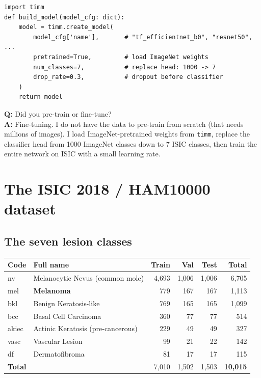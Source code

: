 \documentclass[11pt,a4paper]{article}
\begin{document}
\begin{lstlisting}[caption={\texttt{src/models/build\_model.py}}]
import timm
def build_model(model_cfg: dict):
    model = timm.create_model(
        model_cfg['name'],       # "tf_efficientnet_b0", "resnet50", ...
        pretrained=True,         # load ImageNet weights
        num_classes=7,           # replace head: 1000 -> 7
        drop_rate=0.3,           # dropout before classifier
    )
    return model
\end{lstlisting}

\begin{qa}
\textbf{Q:} Did you pre-train or fine-tune?\\
\textbf{A:} Fine-tuning. I do not have the data to pre-train from scratch (that needs millions of images). I load ImageNet-pretrained weights from \texttt{timm}, replace the classifier head from 1000 ImageNet classes down to 7 ISIC classes, then train the entire network on ISIC with a small learning rate.
\end{qa}

\section{The ISIC 2018 / HAM10000 dataset}

\subsection{The seven lesion classes}

\begin{table}[h]
\centering\small
\begin{tabular}{llrrrr}
\toprule
\textbf{Code} & \textbf{Full name} & \textbf{Train} & \textbf{Val} & \textbf{Test} & \textbf{Total} \\
\midrule
nv    & Melanocytic Nevus (common mole)            & 4{,}693 & 1{,}006 & 1{,}006 & 6{,}705 \\
mel   & \textbf{Melanoma}                          &   779   &   167   &   167   & 1{,}113 \\
bkl   & Benign Keratosis-like                      &   769   &   165   &   165   & 1{,}099 \\
bcc   & Basal Cell Carcinoma                       &   360   &    77   &    77   &   514 \\
akiec & Actinic Keratosis (pre-cancerous)          &   229   &    49   &    49   &   327 \\
vasc  & Vascular Lesion                            &    99   &    21   &    22   &   142 \\
df    & Dermatofibroma                             &    81   &    17   &    17   &   115 \\
\midrule
\multicolumn{2}{l}{\textbf{Total}} & 7{,}010 & 1{,}502 & 1{,}503 & \textbf{10{,}015}\\
\bottomrule
\end{tabular}
\end{table}
\end{document}
